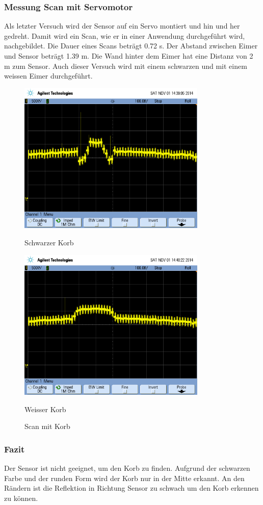 \subsubsection{Messung Scan mit Servomotor}
Als letzter Versuch wird der Sensor auf ein Servo montiert und hin und her 
gedreht. Damit wird ein Scan, wie er in einer Anwendung durchgeführt wird, 
nachgebildet. Die Dauer eines Scans beträgt 0.72 s. Der Abstand zwischen 
Eimer und Sensor beträgt 1.39 m. Die Wand hinter dem Eimer hat eine Distanz 
von 2 m zum Sensor. Auch dieser Versuch wird mit einem schwarzen und mit einem 
weissen Eimer durchgeführt. 
\begin{figure}[h!]
    \begin{minipage}{0.5\textwidth}
        \centering
        \includegraphics[width=0.8\textwidth]{fig/scope_80.png}
        \caption{Schwarzer Korb}
        \label{fig:scan_ir_black}
    \end{minipage}
    \begin{minipage}{0.5\textwidth}
        \centering
        \includegraphics[width=0.8\textwidth]{fig/scope_82.png}
        \caption{Weisser Korb}
        \label{fig:scan_ir_white}
    \end{minipage}
    \caption{Scan mit Korb}
    \label{fig:scan_ir}
\end{figure}

\subsubsection{Fazit}
Der Sensor ist nicht geeignet, um den Korb zu finden. Aufgrund der schwarzen 
Farbe und der runden Form wird der Korb nur in der Mitte erkannt. An den 
Rändern ist die Reflektion in Richtung Sensor zu schwach um den Korb erkennen 
zu können. 

